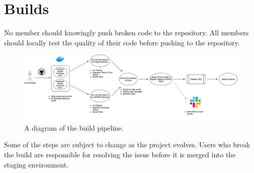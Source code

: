 \documentclass{scrreprt}
\begin{document}
\section{Builds}

No member should knowingly push broken code to the repository.
All members should locally test the quality of their code before
pushing to the repository. 

\begin{figure}[H]
    \includegraphics[width=\linewidth]{build-pipeline}
    \caption{A diagram of the build pipeline.}
    \label{fig:build}
\end{figure}

Some of the steps are subject to change as the project evolves.
Users who break the build are responsible for resolving the issue
before it is merged into the staging environment.
\end{document}
